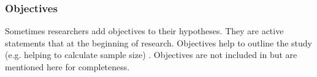
\subsubsection{Objectives}

Sometimes researchers add objectives to their hypotheses. They are active statements that  \cite[p. 280]{Farrugia2009} at the beginning of research. Objectives help to outline the study (e.g. helping to calculate sample size) \cite{Farrugia2009,Vickers}. Objectives are not included in \briefingform but are mentioned here for completeness.